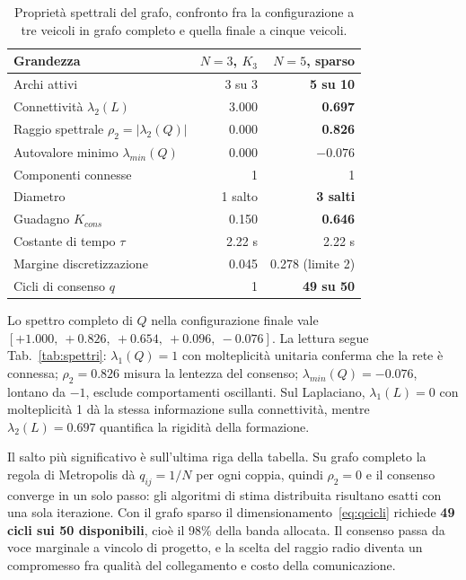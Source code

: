 \documentclass[conference,9pt]{IEEEtran}
\begin{document}
\begin{table}[t]
\centering
\caption{Propriet\`a spettrali del grafo, confronto fra la configurazione a
tre veicoli in grafo completo e quella finale a cinque veicoli.}
\label{tab:grafo}
\begin{tabular}{lrr}
\toprule
\textbf{Grandezza} & \textbf{$N=3$, $K_3$} & \textbf{$N=5$, sparso}\\
\midrule
Archi attivi                       & 3 su 3 & \textbf{5 su 10}\\
Connettivit\`a $\lambda_2(L)$      & 3.000  & \textbf{0.697}\\
Raggio spettrale $\rho_2=|\lambda_2(Q)|$ & 0.000 & \textbf{0.826}\\
Autovalore minimo $\lambda_{min}(Q)$ & 0.000 & $-0.076$\\
Componenti connesse                & 1      & 1\\
Diametro                           & 1 salto & \textbf{3 salti}\\
Guadagno $K_{cons}$                & 0.150  & \textbf{0.646}\\
Costante di tempo $\tau$           & 2.22 s & 2.22 s\\
Margine discretizzazione           & 0.045  & 0.278 (limite 2)\\
Cicli di consenso $q$              & 1      & \textbf{49 su 50}\\
\bottomrule
\end{tabular}
\end{table}

Lo spettro completo di $Q$ nella configurazione finale vale
$[+1.000,\ +0.826,\ +0.654,\ +0.096,\ -0.076]$. La lettura segue
Tab.~\ref{tab:spettri}: $\lambda_1(Q) = 1$ con molteplicit\`a unitaria conferma
che la rete \`e connessa; $\rho_2 = 0.826$ misura la lentezza del consenso;
$\lambda_{min}(Q) = -0.076$, lontano da $-1$, esclude comportamenti oscillanti.
Sul Laplaciano, $\lambda_1(L) = 0$ con molteplicit\`a 1 d\`a la stessa
informazione sulla connettivit\`a, mentre $\lambda_2(L) = 0.697$ quantifica la
rigidit\`a della formazione.

Il salto pi\`u significativo \`e sull'ultima riga della tabella. Su grafo
completo la regola di Metropolis d\`a $q_{ij} = 1/N$ per ogni coppia, quindi
$\rho_2 = 0$ e il consenso converge in un solo passo: gli algoritmi di stima
distribuita risultano esatti con una sola iterazione. Con il grafo sparso il
dimensionamento~\eqref{eq:qcicli} richiede \textbf{49 cicli sui 50 disponibili},
cio\`e il 98\% della banda allocata. Il consenso passa da voce marginale a
vincolo di progetto, e la scelta del raggio radio diventa un compromesso fra
qualit\`a del collegamento e costo della comunicazione.
\end{document}
